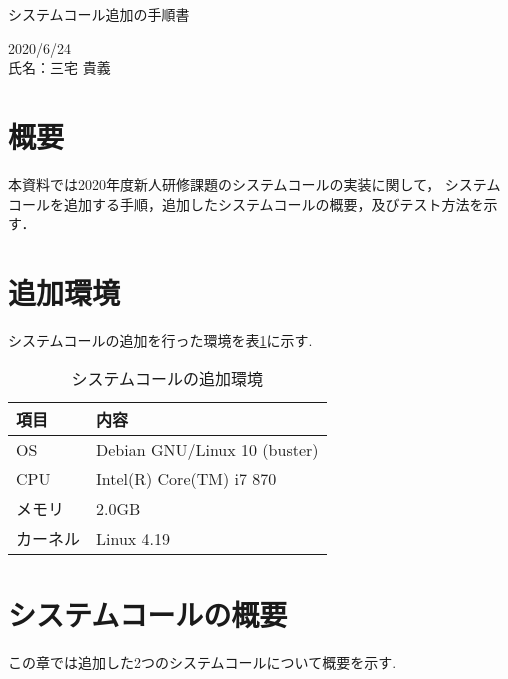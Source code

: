\documentclass[12pt]{jsarticle}
\begin{document}
\begin{center}
{\LARGE システムコール追加の手順書}
\end{center}

\begin{flushright}
  2020/6/24\\
  氏名：三宅 貴義\\
\end{flushright}
\section{概要}
\label{sec:introduction}
本資料では2020年度新人研修課題のシステムコールの実装に関して，
システムコールを追加する手順，追加したシステムコールの概要，及びテスト方法を示す．


\section{追加環境}
\label{sec:dist}
システムコールの追加を行った環境を表\ref{tab:distribution}に示す.

\begin{table}[htb]
  \begin{center}
    \caption{システムコールの追加環境}\label{tab:distribution}
    \begin{tabular}{l|l}
      \hline\hline
      項目 & 内容 \\ \hline
       OS& Debian GNU/Linux 10 (buster) \\ 
       CPU& Intel(R) Core(TM) i7 870 \\
       メモリ& 2.0GB \\
       カーネル& Linux 4.19  \\
      \hline
    \end{tabular}
  \end{center}
\end{table}


\section{システムコールの概要}
\label{sec:discri}
この章では追加した2つのシステムコールについて概要を示す.
\end{document}
